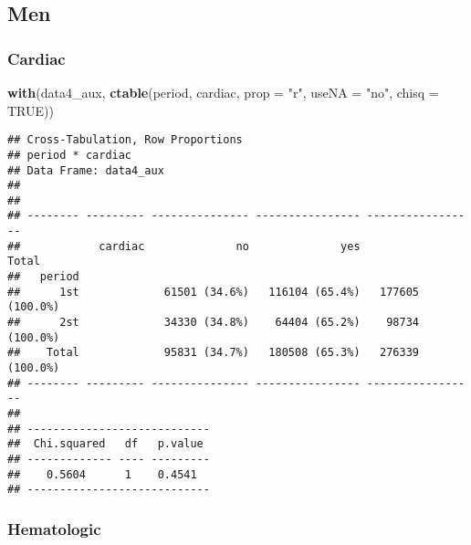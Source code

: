\documentclass[
]{article}
\newenvironment{Shaded}{\begin{snugshade}}{\end{snugshade}}
\newcommand{\DataTypeTok}[1]{\textcolor[rgb]{0.13,0.29,0.53}{#1}}
\newcommand{\KeywordTok}[1]{\textcolor[rgb]{0.13,0.29,0.53}{\textbf{#1}}}
\newcommand{\NormalTok}[1]{#1}
\newcommand{\OperatorTok}[1]{\textcolor[rgb]{0.81,0.36,0.00}{\textbf{#1}}}
\newcommand{\OtherTok}[1]{\textcolor[rgb]{0.56,0.35,0.01}{#1}}
\newcommand{\StringTok}[1]{\textcolor[rgb]{0.31,0.60,0.02}{#1}}
\begin{document}
\hypertarget{men-1}{%
\subsection{Men}\label{men-1}}

\begin{Shaded}
\end{Shaded}

\hypertarget{cardiac-1}{%
\subsubsection{Cardiac}\label{cardiac-1}}

\begin{Shaded}
\begin{Highlighting}[]
\KeywordTok{with}\NormalTok{(data4_aux, }\KeywordTok{ctable}\NormalTok{(period, cardiac, }\DataTypeTok{prop =} \StringTok{"r"}\NormalTok{, }\DataTypeTok{useNA =} \StringTok{"no"}\NormalTok{, }\DataTypeTok{chisq =} \OtherTok{TRUE}\NormalTok{))}
\end{Highlighting}
\end{Shaded}

\begin{verbatim}
## Cross-Tabulation, Row Proportions  
## period * cardiac  
## Data Frame: data4_aux  
## 
## 
## -------- --------- --------------- ---------------- -----------------
##            cardiac              no              yes             Total
##   period                                                             
##      1st             61501 (34.6%)   116104 (65.4%)   177605 (100.0%)
##      2st             34330 (34.8%)    64404 (65.2%)    98734 (100.0%)
##    Total             95831 (34.7%)   180508 (65.3%)   276339 (100.0%)
## -------- --------- --------------- ---------------- -----------------
## 
## ----------------------------
##  Chi.squared   df   p.value 
## ------------- ---- ---------
##    0.5604      1    0.4541  
## ----------------------------
\end{verbatim}

\hypertarget{hematologic-1}{%
\subsubsection{Hematologic}\label{hematologic-1}}
\end{document}
